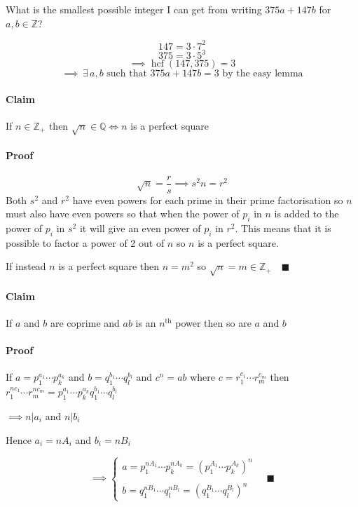 \documentclass{article}
\newcommand{\bb}[1]{\mathbb{#1}}
\newcommand{\E}{\,\exists\,}
\newcommand{\hcf}{\operatorname{hcf}}
\begin{document}
What is the smallest possible integer I can get from writing \(375a + 147b\) for \(a,b\in\bb Z\)?

\[147 = 3\cdot7^2\]
\[375 = 3\cdot5^3\]
\[\implies \hcf(147, 375) = 3\]
\[\implies \E a,b \text{ such that }375a+147b = 3\text{ by the easy lemma}\]

\paragraph{Claim} If \(n\in\bb Z_+\) then \(\sqrt n\in\bb Q\iff n\) is a perfect square 

\paragraph{Proof} 
\[\sqrt n = \frac rs\implies s^2n=r^2\]
Both \(s^2\) and \(r^2\) have even powers for each prime in their prime factorisation so \(n\) must also have even powers so that when the power of \(p_i\) in \(n\) is added to the power of \(p_i\) in \(s^2\) it will give an even power of \(p_i\) in \(r^2\). This means that it is possible to factor a power of 2 out of \(n\) so \(n\) is a perfect square.

If instead \(n\) is a perfect square then \(n = m^2\) so \(\sqrt n = m\in\bb Z_+\quad\blacksquare\)

\paragraph{Claim} If \(a\) and \(b\) are coprime and \(ab\) is an \(n^{\text{th}}\) power then so are \(a\) and \(b\)

\paragraph{Proof} If \(a = p_1^{a_1}\dotsm p_k^{a_k}\) and \(b = q_1^{b_1}\dotsm q_l^{b_l}\) and \(c^n = ab\) where \(c = r_1^{c_1}\dotsm r_m^{c_m}\) then \(r_1^{nc_1}\dotsm r_m^{nc_m} = p_1^{a_1}\dotsm p_k^{a_k} q_1^{b_1}\dotsm q_l^{b_l}\)

\(\implies n|a_i\) and \(n|b_i\)

Hence \(a_i = nA_i\) and \(b_i = nB_i\)

\[\implies \left\{
\begin{array}{l}
a = p_1^{nA_1}\dotsm p_k^{nA_k} = (p_1^{A_1}\dotsm p_k^{A_k})^n\\
\\ [-1 em]
b = q_1^{nB_1}\dotsm q_l^{nB_l} = (q_1^{B_1}\dotsm q_l^{B_l})^n
\end{array}
\right.\quad\blacksquare\]
\end{document}
